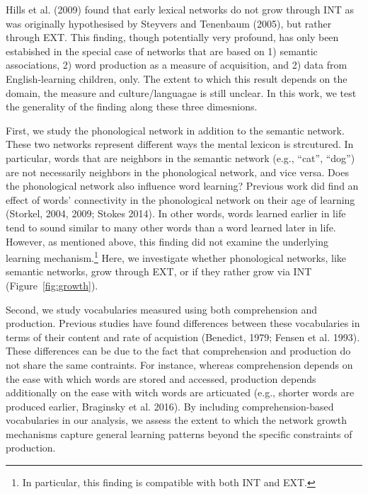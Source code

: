 \documentclass[english,floatsintext,man]{apa6}
\theoremstyle{definition}
\theoremstyle{definition}
\theoremstyle{definition}
\theoremstyle{remark}
\begin{document}
Hills et al. (2009) found that early lexical networks do not grow
through INT as was originally hypothesised by Steyvers and Tenenbaum
(2005), but rather through EXT. This finding, though potentially very
profound, has only been estabished in the special case of networks that
are based on 1) semantic associations, 2) word production as a measure
of acquisition, and 2) data from English-learning children, only. The
extent to which this result depends on the domain, the measure and
culture/languagae is still unclear. In this work, we test the generality
of the finding along these three dimesnions.

First, we study the phonological network in addition to the semantic
network. These two networks represent different ways the mental lexicon
is strcutured. In particular, words that are neighbors in the semantic
network (e.g., \enquote{cat}, \enquote{dog}) are not necessarily
neighbors in the phonological network, and vice versa. Does the
phonological network also influence word learning? Previous work did
find an effect of words' connectivity in the phonological network on
their age of learning (Storkel, 2004, 2009; Stokes 2014). In other
words, words learned earlier in life tend to sound similar to many other
words than a word learned later in life. However, as mentioned above,
this finding did not examine the underlying learning
mechanism.\footnote{In particular, this finding is compatible with both INT and EXT.}
Here, we investigate whether phonological networks, like semantic
networks, grow through EXT, or if they rather grow via INT
(Figure~\ref{fig:growth}).

Second, we study vocabularies measured using both comprehension and
production. Previous studies have found differences between these
vocabularies in terms of their content and rate of acquistion (Benedict,
1979; Fensen et al. 1993). These differences can be due to the fact that
comprehension and production do not share the same contraints. For
instance, whereas comprehension depends on the ease with which words are
stored and accessed, production depends additionally on the ease with
witch words are articuated (e.g., shorter words are produced earlier,
Braginsky et al. 2016). By including comprehension-based vocabularies in
our analysis, we assess the extent to which the network growth
mechanisms capture general learning patterns beyond the specific
constraints of production.
\end{document}
